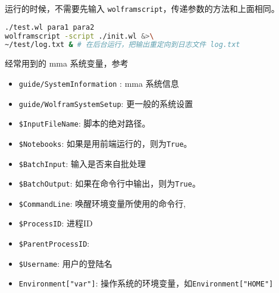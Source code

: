 运行的时候，不需要先输入 \verb`wolframscript`，传递参数的方法和上面相同。

\begin{lstlisting}[language=bash]
./test.wl para1 para2
wolframscript -script ./init.wl &>\
~/test/log.txt & # 在后台运行，把输出重定向到日志文件 log.txt
\end{lstlisting}

经常用到的 mma 系统变量，参考

\begin{itemize}
\item \verb`guide/SystemInformation` : mma 系统信息
\item \verb`guide/WolframSystemSetup`: 更一般的系统设置
\item \verb`$InputFileName`: 脚本的绝对路径。
\item \verb`$Notebooks`: 如果是用前端运行的，则为\verb`True`。
\item \verb`$BatchInput`: 输入是否来自批处理
\item \verb`$BatchOutput`: 如果在命令行中输出，则为\verb`True`。
\item \verb`$CommandLine`: 唤醒环境变量所使用的命令行,
\item \verb`$ProcessID`: 进程ID
\item \verb`$ParentProcessID`:
\item \verb`$Username`: 用户的登陆名
\item \verb`Environment["var"]`: 操作系统的环境变量，如\verb`Environment["HOME"]`
\end{itemize}
